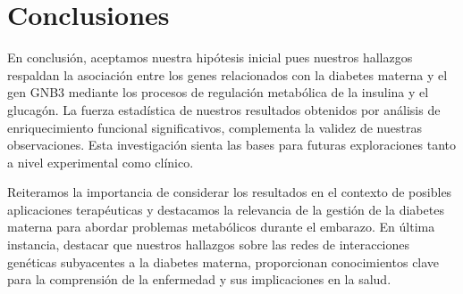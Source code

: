 \section{Conclusiones}

En conclusión, aceptamos nuestra hipótesis inicial pues nuestros hallazgos respaldan la asociación entre los genes relacionados con la diabetes materna y el gen GNB3 mediante los procesos de regulación metabólica de la insulina y el glucagón. La fuerza estadística de nuestros resultados obtenidos por análisis de enriquecimiento funcional significativos, complementa la validez de nuestras observaciones. Esta investigación sienta las bases para futuras exploraciones tanto a nivel experimental como clínico.

Reiteramos la importancia de considerar los resultados en el contexto de posibles aplicaciones terapéuticas y destacamos la relevancia de la gestión de la diabetes materna para abordar problemas metabólicos durante el embarazo. En última instancia, destacar que nuestros hallazgos sobre las redes de interacciones genéticas subyacentes a la diabetes materna, proporcionan conocimientos clave para la comprensión de la enfermedad y sus implicaciones en la salud.

